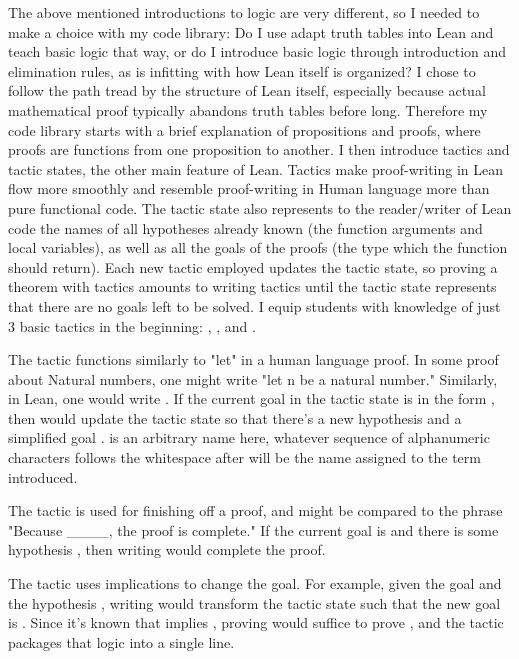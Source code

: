 The above mentioned introductions to logic are very different, so I needed
to make a choice with my code library: Do I use adapt truth tables into
Lean and teach basic logic that way, or do I introduce basic logic through
introduction and elimination rules, as is infitting with how Lean itself 
is organized? I chose to follow the path tread by the structure of Lean itself,
especially because actual mathematical proof typically abandons truth tables
before long. Therefore my code library starts with a brief explanation of
propositions and proofs, where proofs are functions from one proposition to
another. I then introduce tactics and tactic states, the other main feature
of Lean. Tactics make proof-writing in Lean flow more smoothly and resemble 
proof-writing in Human language more than pure functional code. The tactic
state also represents to the reader/writer of Lean code the names of all
hypotheses already known (the function arguments and local variables), as 
well as all the goals of the proofs (the type which the function should return).
Each new tactic employed updates the tactic state, so proving a theorem with
tactics amounts to writing tactics until the tactic state represents that there
are no goals left to be solved. I equip students with knowledge of just 3 basic
tactics in the beginning: , , and .

The  tactic functions similarly to "let" in a human language proof. 
In some proof about Natural numbers, one might write "let n be a natural number."
Similarly, in Lean, one would write .
If the current goal in the tactic state is in the form , then
 would update the tactic state so that there's a new hypothesis
 and a simplified goal .  is an arbitrary name here, whatever
sequence of alphanumeric characters follows the whitespace after  will
be the name assigned to the term introduced. 

The  tactic is used for finishing off a proof, and might be compared
to the phrase "Because \_\_\_\_, the proof is complete." If the current goal is
 and there is some hypothesis , 
then writing  would complete the proof.

The  tactic uses implications to change the goal. For example, 
given the goal  and the hypothesis , writing
 would transform the tactic state such that the new goal
is . Since it's known that  implies , 
proving  would suffice to prove , and the 
tactic packages that logic into a single line.

